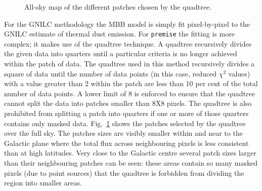 \documentclass[a4paper,fleqn,usenatbib]{mnras}
\begin{document}
\begin{figure}
\centering
{}
\caption{All-sky map of the different patches chosen by the quadtree.}
\label{fig:patches}
\end{figure}

For the GNILC methodology the MBB model is simply fit pixel-by-pixel to the GNILC estimate of thermal dust emission. For {\texttt{premise}} the fitting is more complex; it makes use of the quadtree technique. A quadtree recursively divides the given data into quarters until a particular criteria is no longer achieved within the patch of data. The quadtree used in this method recursively divides a square of data until the number of data points (in this case, reduced $\chi^{2}$ values) with a value greater than 2 within the patch are less than 10 per cent of the total number of data points. A lower limit of 8 is enforced to ensure that the quadtree cannot split the data into patches smaller than 8X8 pixels. The quadtree is also prohibited from splitting a patch into quarters if one or more of those quarters contains only masked data. Fig.~\ref{fig:patches} shows the patches selected by the quadtree over the full sky. The patches sizes are visibly smaller within and near to the Galactic plane where the total flux across neighbouring pixels is less consistent than at high latitudes. Very close to the Galactic centre several patch sizes larger than their neighbouring patches can be seen: these areas contain so many masked pixels (due to point sources) that the quadtree is forbidden from dividing the region into smaller areas.  
\end{document}
